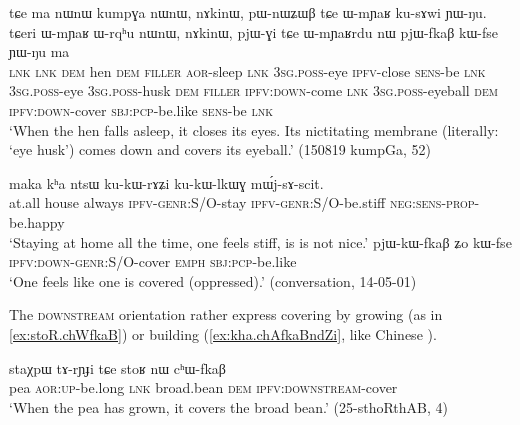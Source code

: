 \begin{exe}
\ex \label{ex:pjWGi.tCe.pjWfkaB}
\gll  tɕe ma nɯnɯ kumpɣa nɯnɯ, nɤkinɯ, pɯ-nɯʑɯβ tɕe ɯ-mɲaʁ ku-sɤwi ɲɯ-ŋu. tɕeri ɯ-mɲaʁ ɯ-rqʰu nɯnɯ, nɤkinɯ, pjɯ-ɣi tɕe ɯ-mɲaʁrdu nɯ pjɯ-fkaβ kɯ-fse ɲɯ-ŋu ma \\
\textsc{lnk} \textsc{lnk} \textsc{dem} hen \textsc{dem} \textsc{filler} \textsc{aor}-sleep \textsc{lnk} \textsc{3sg}.\textsc{poss}-eye \textsc{ipfv}-close \textsc{sens}-be \textsc{lnk} \textsc{3sg}.\textsc{poss}-eye \textsc{3sg}.\textsc{poss}-husk \textsc{dem} \textsc{filler} \textsc{ipfv}:\textsc{down}-come \textsc{lnk} \textsc{3sg}.\textsc{poss}-eyeball \textsc{dem} \textsc{ipfv}:\textsc{down}-cover \textsc{sbj}:\textsc{pcp}-be.like \textsc{sens}-be \textsc{lnk} \\
\glt `When the hen falls asleep, it closes its eyes. Its nictitating membrane (literally: `eye husk') comes down and covers its eyeball.' (150819 kumpGa, 52)
\end{exe}

\begin{exe}
\ex 
\begin{xlist}
\ex 
\gll maka kʰa ntsɯ ku-kɯ-rɤʑi ku-kɯ-lkɯɣ mɯ́j-sɤ-scit. \\
at.all house always \textsc{ipfv}-\textsc{genr}:S/O-stay \textsc{ipfv}-\textsc{genr}:S/O-be.stiff \textsc{neg}:\textsc{sens}-\textsc{prop}-be.happy \\
\glt `Staying at home all the time, one feels stiff, is is not nice.'
\ex \label{ex:pjWkWfkaB}
\gll pjɯ-kɯ-fkaβ ʑo kɯ-fse \\
\textsc{ipfv}:\textsc{down}-\textsc{genr}:S/O-cover \textsc{emph} \textsc{sbj}:\textsc{pcp}-be.like \\
\glt `One feels like one is covered (oppressed).' (conversation, 14-05-01)
\end{xlist}
\end{exe}

The \textsc{downstream} orientation rather express covering by growing (as in \ref{ex:stoR.chWfkaB}) or building (\ref{ex:kha.chAfkaBndZi}, like Chinese ).

\begin{exe}
\ex \label{ex:stoR.chWfkaB}
\gll staχpɯ tɤ-rɲɟi tɕe stoʁ nɯ cʰɯ-fkaβ\\
pea \textsc{aor}:\textsc{up}-be.long \textsc{lnk} broad.bean \textsc{dem} \textsc{ipfv}:\textsc{downstream}-cover\\
\glt `When the pea has grown, it covers the broad bean.' (25-sthoRthAB, 4)
\end{exe}

